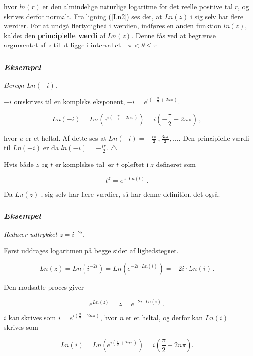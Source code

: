 \documentclass[a4paper, 12pt,titlepage]{article}
\begin{document}
hvor \(ln(r)\) er den almindelige naturlige logaritme for det reelle positive tal \(r\), og skrives derfor normalt. Fra ligning (\ref{Ln2}) ses det, at \(Ln(z)\) i sig selv har flere værdier. For at undgå flertydighed i værdien, indføres en anden funktion \(ln(z)\), kaldet den \textbf{principielle værdi} af \(Ln(z)\). Denne fås ved at begrænse argumentet af \(z\) til at ligge i intervallet \(-\pi < \theta \leq \pi\).

\subsubsection*{\emph{Eksempel}}
\label{sec:org12a8652}
\emph{Beregn \(Ln(-i)\).}

\(-i\) omskrives til en kompleks eksponent, \(-i = e^{i \left(-\frac{\pi}{2} + 2 n \pi\right)}\).

$$Ln(-i) = Ln \left(e^{i \left(-\frac{\pi}{2} + 2 n \pi\right)}\right) = i\left(-\frac{\pi}{2} + 2 n \pi\right)\,,$$

hvor \(n\) er et heltal. Af dette ses at \(Ln(-i) =-\frac{i \pi}{2}\, , \frac{3 i \pi}{2} \, , \dots\).
Den principielle værdi til \(Ln(-i)\) er da \(ln(-i) = -\frac{i \pi}{2}\). \(\triangle\)


Hvis både \(z\) og \(t\) er komplekse tal, er \(t\) opløftet i \(z\) defineret som

\begin{equation}
\label{tz}
    t^z = e^{z \cdot Ln(t)}\,.
\end{equation}

Da \(Ln(z)\) i sig selv har flere værdier, så har denne definition det også.

\subsubsection*{\emph{Eksempel}}
\label{sec:org2332136}
\emph{Reducer udtrykket \(z=i^{-2i}\).}

Først uddrages logaritmen på begge sider af lighedstegnet.

$$Ln(z) = Ln\left(i^{-2i}\right) = Ln \left(e^{-2i \cdot Ln(i)}\right) = -2i \cdot Ln(i)\,.$$

Den modsatte proces giver

$$e^{Ln(z)} = z = e^{-2i \cdot Ln(i)} \,.$$

\(i\) kan skrives som \(i=e^{i \left( \frac{\pi}{2} + 2 n \pi\right)}\), hvor \(n\) er et heltal, og derfor kan \(Ln(i)\) skrives som

$$Ln(i) = Ln \left(e^{i\left(\frac{\pi}{2} + 2 n \pi\right)}\right) = i \left(\frac{\pi}{2} + 2 n \pi\right).$$
\end{document}
